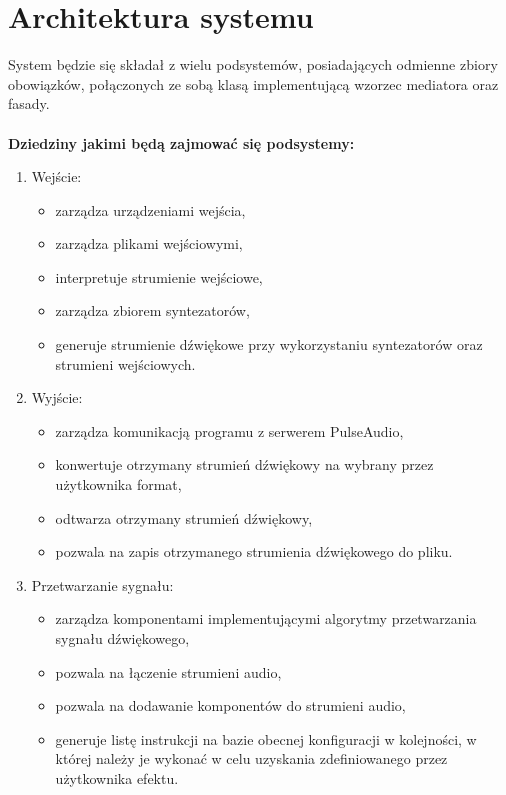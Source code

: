 \section{Architektura systemu}
System będzie się składał z wielu podsystemów, posiadających odmienne zbiory obowiązków, połączonych ze sobą klasą implementującą wzorzec mediatora oraz fasady\cite{bib:DesignPatterns}.
\\\\
\textbf{Dziedziny jakimi będą zajmować się podsystemy:}
\begin{enumerate}
    \item Wejście:
        \begin{itemize}
            \item zarządza urządzeniami wejścia,
            \item zarządza plikami wejściowymi,
            \item interpretuje strumienie wejściowe,
            \item zarządza zbiorem syntezatorów,
            \item generuje strumienie dźwiękowe przy wykorzystaniu syntezatorów oraz strumieni wejściowych.
        \end{itemize}
    \item Wyjście:
        \begin{itemize}
            \item zarządza komunikacją programu z serwerem PulseAudio\cite{bib:PulseAudio},
            \item konwertuje otrzymany strumień dźwiękowy na wybrany przez użytkownika format,
            \item odtwarza otrzymany strumień dźwiękowy,
            \item pozwala na zapis otrzymanego strumienia dźwiękowego do pliku.
        \end{itemize}
    \item Przetwarzanie sygnału:
        \begin{itemize}
            \item zarządza komponentami implementującymi algorytmy przetwarzania sygnału dźwiękowego,
            \item pozwala na łączenie strumieni audio,
            \item pozwala na dodawanie komponentów do strumieni audio,
            \item generuje listę instrukcji na bazie obecnej konfiguracji w kolejności, w której należy je wykonać w celu uzyskania zdefiniowanego przez użytkownika efektu.

\end{itemize}
\end{enumerate}
